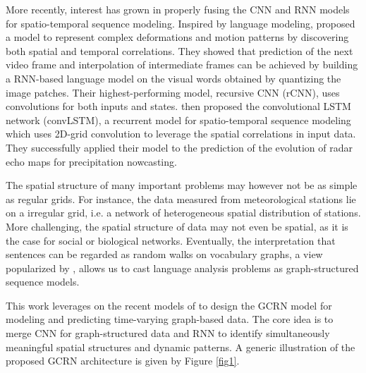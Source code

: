 \documentclass{article} %
\newcommand{\todo}[1]{{\color{red} #1 }}
\begin{document}
More recently, interest has grown in properly fusing the CNN and RNN models for
spatio-temporal sequence modeling. Inspired by language modeling,
\citet{video_language_model} proposed a model to represent complex deformations
and motion patterns by discovering both spatial and temporal correlations. They showed that prediction of the next video frame and
interpolation of intermediate frames can be achieved by building a RNN-based
language model on the visual words obtained by quantizing the image patches.
Their highest-performing model, recursive CNN (rCNN), uses convolutions for both
 inputs and states. \citet{convlstm}  then proposed the convolutional
LSTM network (convLSTM), a recurrent model for spatio-temporal sequence
modeling which uses 2D-grid convolution to leverage the spatial correlations in
input data. They successfully applied their model to the prediction of the
evolution of radar echo maps for precipitation nowcasting.



The spatial structure of many important problems may however not be as simple as regular grids. For instance, 
the data measured from meteorological stations lie on a irregular grid, i.e. a network of heterogeneous spatial
distribution of stations. More challenging, the spatial structure of data may not even be spatial, as it is the case for social or biological networks. Eventually, the interpretation that sentences can be regarded as random walks on vocabulary graphs,
a view popularized by \cite{word2vec}, allows us to cast language analysis problems as graph-structured sequence models.

This work leverages on the recent models of \cite{gcnn,video_language_model,convlstm} to design the GCRN model for modeling and predicting time-varying graph-based data. The core idea is to merge CNN for graph-structured data and RNN to identify simultaneously meaningful spatial structures and dynamic patterns. A generic illustration of the proposed GCRN architecture is given by Figure \ref{fig1}.
\end{document}
